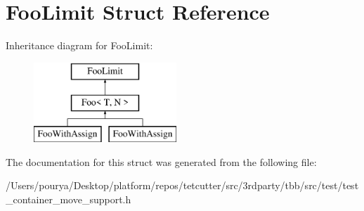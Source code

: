 \hypertarget{structFooLimit}{}\section{Foo\+Limit Struct Reference}
\label{structFooLimit}
Inheritance diagram for Foo\+Limit\+:\begin{figure}[H]
\begin{center}
\leavevmode
\includegraphics[height=3.000000cm]{structFooLimit}
\end{center}
\end{figure}


The documentation for this struct was generated from the following file\+:\begin{DoxyCompactItemize}
\item 
/\+Users/pourya/\+Desktop/platform/repos/tetcutter/src/3rdparty/tbb/src/test/test\+\_\+container\+\_\+move\+\_\+support.\+h\end{DoxyCompactItemize}
